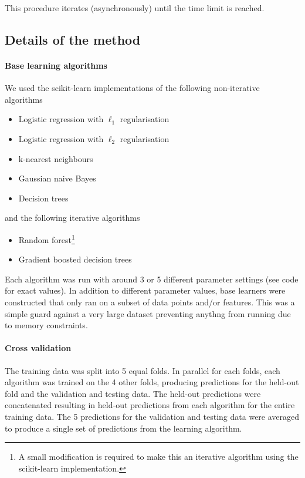 \documentclass{article} %
\begin{document}
This procedure iterates (asynchronously) until the time limit is reached.

\subsection{Details of the method}

\paragraph{Base learning algorithms}

We used the scikit-learn implementations of the following non-iterative\footnotemark{} algorithms
\begin{itemize}
  \item Logistic regression with $\ell_1$ regularisation
  \item Logistic regression with $\ell_2$ regularisation
  \item k-nearest neighbours
  \item Gaussian naive Bayes
  \item Decision trees
\end{itemize}
and the following iterative algorithms
\begin{itemize}
  \item Random forest\footnote{A small modification is required to make this an iterative algorithm using the scikit-learn implementation.}
  \item Gradient boosted decision trees
\end{itemize}
Each algorithm was run with around 3 or 5 different parameter settings (see code for exact values).
In addition to different parameter values, base learners were constructed that only ran on a subset of data points and/or features.
This was a simple guard against a very large dataset preventing anythng from running due to memory constraints.

\paragraph{Cross validation}

The training data was split into 5 equal folds.
In parallel for each folds, each algorithm was trained on the 4 other folds, producing predictions for the held-out fold and the validation and testing data.
The held-out predictions were concatenated resulting in held-out predictions from each algorithm for the entire training data.
The 5 predictions for the validation and testing data were averaged to produce a single set of predictions from the learning algorithm.
\end{document}
